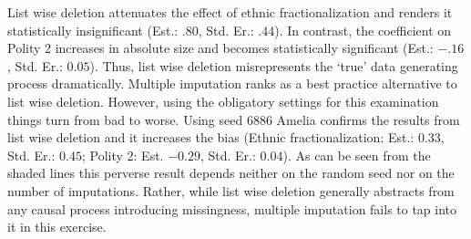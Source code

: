 \documentclass{scrartcl}\usepackage[]{graphicx}\usepackage[]{color}
\begin{document}
List wise deletion attenuates the effect of ethnic
fractionalization and renders it statistically insignificant
(Est.: $.80$, Std. Er.: $.44$). In contrast, the
coefficient on Polity 2 increases in absolute size and
becomes statistically significant (Est.: $-.16$, Std. Er.:
$0.05$). Thus, list wise deletion misrepresents the `true'
data generating process dramatically. Multiple imputation
ranks as a best practice alternative to list wise deletion.
However, using the obligatory settings for this examination
things turn from bad to worse. Using seed $6886$ Amelia 
confirms the results from list wise deletion and it 
increases the bias (Ethnic fractionalization: Est.: $0.33$, 
Std. Er.: $0.45$; Polity 2: Est. $-0.29$, Std. Er.: $0.04$).
As can be seen from the shaded lines this perverse result 
depends neither on the random seed nor on the number of 
imputations. Rather, while list wise deletion generally 
abstracts from any causal process introducing missingness, 
multiple imputation fails to tap into it in this exercise.
\end{document}
